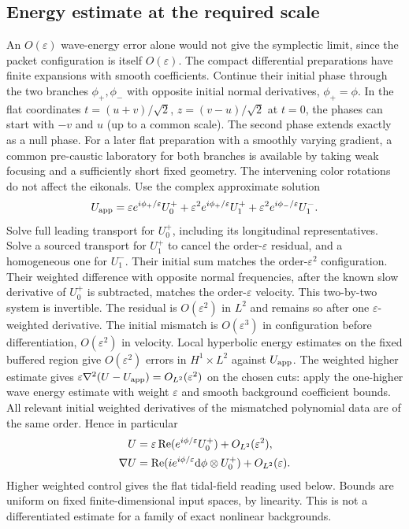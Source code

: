 \documentclass[11pt]{article}
\newcommand{\dd}{\mathrm d}
\newcommand{\eps}{\varepsilon}
\newcommand{\re}{\operatorname{Re}}
\begin{document}
\subsection{Energy estimate at the required scale}
An \(O(\eps)\) wave-energy error alone would not give the
symplectic limit, since the packet configuration is itself
\(O(\eps)\). The compact differential preparations have
finite expansions with smooth coefficients. Continue their
initial phase through the two branches \(\phi_+,\phi_-\)
with opposite initial normal derivatives, \(\phi_+=\phi\).
In the flat coordinates \(t=(u+v)/\sqrt2\),
\(z=(v-u)/\sqrt2\) at \(t=0\), the phases can start with
\(-v\) and \(u\) (up to a common scale). The second phase
extends exactly as a null phase. For a later flat preparation
with a smoothly varying gradient, a common pre-caustic
laboratory for both branches is available by taking weak
focusing and a sufficiently short fixed geometry.
The intervening color rotations do not affect the eikonals.
Use the complex approximate solution
\[
 U_{\rm app}=\eps e^{i\phi_+/\eps}U_0^+
            +\eps^2 e^{i\phi_+/\eps}U_1^+
            +\eps^2 e^{i\phi_-/\eps}U_1^- .
\]
Solve full leading transport for \(U_0^+\), including its
longitudinal representatives. Solve a sourced transport
for \(U_1^+\) to cancel the order-\(\eps\) residual, and a
homogeneous one for \(U_1^-\). Their initial sum matches
the order-\(\eps^2\) configuration. Their weighted
difference with opposite normal frequencies, after the
known slow derivative of \(U_0^+\) is subtracted, matches
the order-\(\eps\) velocity. This two-by-two system is
invertible. The residual is \(O(\eps^2)\) in \(L^2\) and
remains so after one \(\eps\)-weighted derivative.
The initial mismatch is \(O(\eps^3)\) in configuration
before differentiation, \(O(\eps^2)\) in velocity.
Local hyperbolic energy estimates on the fixed buffered
region give \(O(\eps^2)\) errors in \(H^1\times L^2\)
against \(U_{\rm app}\). The weighted higher estimate
gives \(\eps\nabla^2(U-U_{\rm app})=O_{L^2}(\eps^2)\)
on the chosen cuts: apply the one-higher wave energy
estimate with weight \(\eps\) and smooth background
coefficient bounds. All relevant initial weighted
derivatives of the mismatched polynomial data are of
the same order. Hence in particular
\begin{align}
 U&=\eps\re(e^{i\phi/\eps}U_0^+)+O_{L^2}(\eps^2),\notag\\
 \nabla U&=\re(ie^{i\phi/\eps}\dd\phi\otimes U_0^+)
                         +O_{L^2}(\eps).\label{eq:errors}
\end{align}
Higher weighted control gives the flat tidal-field reading
used below. Bounds are uniform on fixed finite-dimensional
input spaces, by linearity. This is not a differentiated
estimate for a family of exact nonlinear backgrounds.
\end{document}
